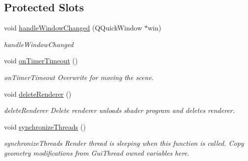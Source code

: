 \subsection*{Protected Slots}
\begin{DoxyCompactItemize}
\item 
void \mbox{\hyperlink{class_g_l_item_a95c8f2a7aa5d735bf73b7566fd4d12da}{handle\+Window\+Changed}} (Q\+Quick\+Window $\ast$win)
\begin{DoxyCompactList}\small\item\em handle\+Window\+Changed \end{DoxyCompactList}\item 
\mbox{\label{class_g_l_item_acc7a813e42fb63bc6b7f2cf680b62717}} 
void \mbox{\hyperlink{class_g_l_item_acc7a813e42fb63bc6b7f2cf680b62717}{on\+Timer\+Timeout}} ()
\begin{DoxyCompactList}\small\item\em on\+Timer\+Timeout Overwrite for moving the scene. \end{DoxyCompactList}\item 
\mbox{\label{class_g_l_item_a88da6fcb94651b2d45bda9527d7e64c9}} 
void \mbox{\hyperlink{class_g_l_item_a88da6fcb94651b2d45bda9527d7e64c9}{delete\+Renderer}} ()
\begin{DoxyCompactList}\small\item\em delete\+Renderer Delete renderer unloads shader program and deletes renderer. \end{DoxyCompactList}\item 
\mbox{\label{class_g_l_item_a790da330a5b53f0156c144b68eff20c2}} 
void \mbox{\hyperlink{class_g_l_item_a790da330a5b53f0156c144b68eff20c2}{synchronize\+Threads}} ()
\begin{DoxyCompactList}\small\item\em synchronize\+Threads Render thread is sleeping when this function is called. Copy geometry modifications from Gui\+Thread owned variables here. \end{DoxyCompactList}\end{DoxyCompactItemize}
